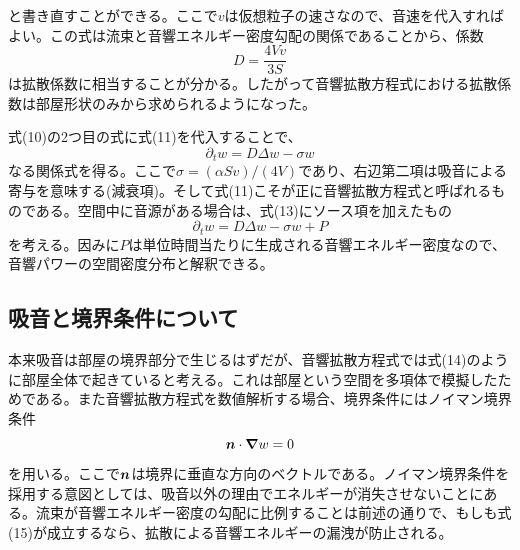 \documentclass[dvipdfmx, 9pt, a4paper]{jsarticle}
\newcommand{\bm}[1]{{\mbox{\boldmath $#1$}}}
\begin{document}
と書き直すことができる。ここで$v$は仮想粒子の速さなので、音速を代入すればよい。この式は流束と音響エネルギー密度勾配の関係であることから、係数
\begin{equation}
D=\frac{4Vv}{3S}
\end{equation}
は拡散係数に相当することが分かる。したがって音響拡散方程式における拡散係数は部屋形状のみから求められるようになった。\par
式(10)の2つ目の式に式(11)を代入することで、
\begin{equation}
\partial_t w=D\Delta w-\sigma w
\end{equation}
なる関係式を得る。ここで$\sigma = (\alpha Sv)/(4V)$であり、右辺第二項は吸音による寄与を意味する(減衰項)。そして式(11)こそが正に音響拡散方程式と呼ばれるものである。空間中に音源がある場合は、式(13)にソース項を加えたもの
\begin{equation}
\partial_t w=D\Delta w-\sigma w+P
\end{equation}
を考える。因みに$P$は単位時間当たりに生成される音響エネルギー密度なので、音響パワーの空間密度分布と解釈できる。


\subsection{吸音と境界条件について}
本来吸音は部屋の境界部分で生じるはずだが、音響拡散方程式では式(14)のように部屋全体で起きていると考える。これは部屋という空間を多項体で模擬したためである。また音響拡散方程式を数値解析する場合、境界条件にはノイマン境界条件
\begin{equation}
\bm n \cdot \bm \nabla w=0
\end{equation}
を用いる。ここで$\bm n$は境界に垂直な方向のベクトルである。ノイマン境界条件を採用する意図としては、吸音以外の理由でエネルギーが消失させないことにある。流束が音響エネルギー密度の勾配に比例することは前述の通りで、もしも式(15)が成立するなら、拡散による音響エネルギーの漏洩が防止される。
\end{document}
